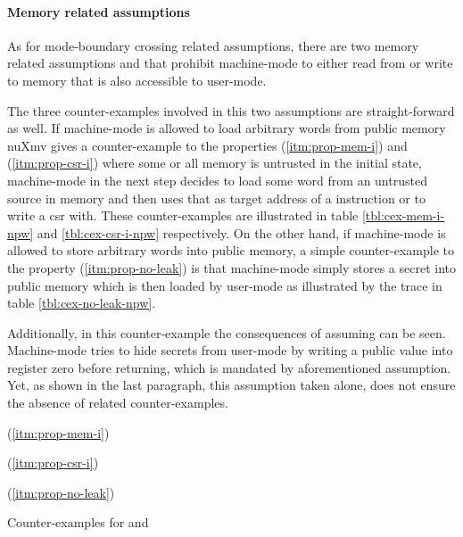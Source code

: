 \paragraph{Memory related assumptions}
As for mode-boundary crossing related assumptions, there are two memory related assumptions  and  that prohibit machine-mode to either read from or write to memory that is also accessible to user-mode.

The three counter-examples involved in this two assumptions are straight-forward as well.
If machine-mode is allowed to load arbitrary words from public memory nuXmv gives a counter-example to the properties  (\ref{itm:prop-mem-i}) and  (\ref{itm:prop-csr-i}) where some or all memory is untrusted in the initial state, machine-mode in the next step decides to load some word from an untrusted source in memory and then uses that as target address of a  instruction or to write a \gls{csr} with.
These counter-examples are illustrated in table \ref{tbl:cex-mem-i-npw} and \ref{tbl:cex-csr-i-npw} respectively.
On the other hand, if machine-mode is allowed to store arbitrary words into public memory, a simple counter-example to the  property (\ref{itm:prop-no-leak}) is that machine-mode simply stores a secret into public memory which is then loaded by user-mode as illustrated by the trace in table \ref{tbl:cex-no-leak-npw}.

Additionally, in this counter-example the consequences of assuming  can be seen.
Machine-mode tries to hide secrets from user-mode by writing a public value into register zero before returning, which is mandated by aforementioned assumption.
Yet, as shown in the last paragraph, this assumption taken alone, does not ensure the absence of  related counter-examples.

\begin{table}
    \begin{subtable}{\textwidth}
        \centering
        
        \caption{ (\ref{itm:prop-mem-i})}
        \label{tbl:cex-mem-i-npw}
    \end{subtable}

    \begin{subtable}{\textwidth}
        \centering
        
        \caption{ (\ref{itm:prop-csr-i})}
        \label{tbl:cex-csr-i-npw}
    \end{subtable}

    \begin{subtable}{\textwidth}
        \centering
        
        \caption{ (\ref{itm:prop-no-leak})}
        \label{tbl:cex-no-leak-npw}
    \end{subtable}
    \caption{Counter-examples for  and }
\end{table}

